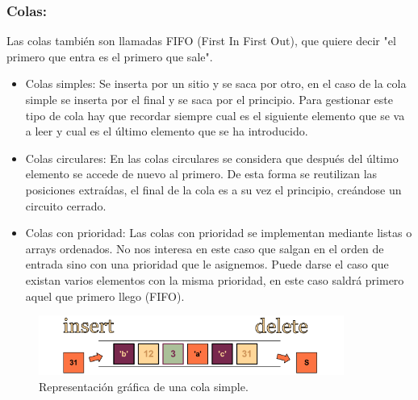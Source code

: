 \documentclass[12pt,letterpaper]{article}
\begin{document}
\subsubsection{Colas:}
Las colas también son llamadas FIFO (First In First Out), que quiere decir "el primero que entra es el primero que sale". 
\begin{itemize}
\item Colas simples: Se inserta por un sitio y se saca por otro, en el caso de la cola simple se inserta por el final y se saca por el principio. Para gestionar este tipo de cola hay que recordar siempre cual es el siguiente elemento que se va a leer y cual es el último elemento que se ha introducido. 
\item Colas circulares: En las colas circulares se considera que después del último  elemento se accede de nuevo al primero. De esta forma se reutilizan las posiciones extraí­das, el final de la cola es a su vez el principio, creándose un circuito cerrado.
\item Colas con prioridad: Las colas con prioridad se implementan mediante listas o arrays ordenados. No nos interesa en este caso que salgan en el orden de entrada sino con una prioridad que le asignemos. Puede darse el caso que existan varios elementos con la misma prioridad, en este caso saldrá primero aquel que primero llego (FIFO).
\end{itemize}
\vspace*{-0.2in}
\begin{figure}[h]
\begin{center}
\includegraphics[width=10cm]{./Imagenes/cola.png}
\caption{Representación gráfica de una cola simple.}
\label{rg4}
\end{center}
\end{figure}
\vspace*{-0.4in}
\end{document}
